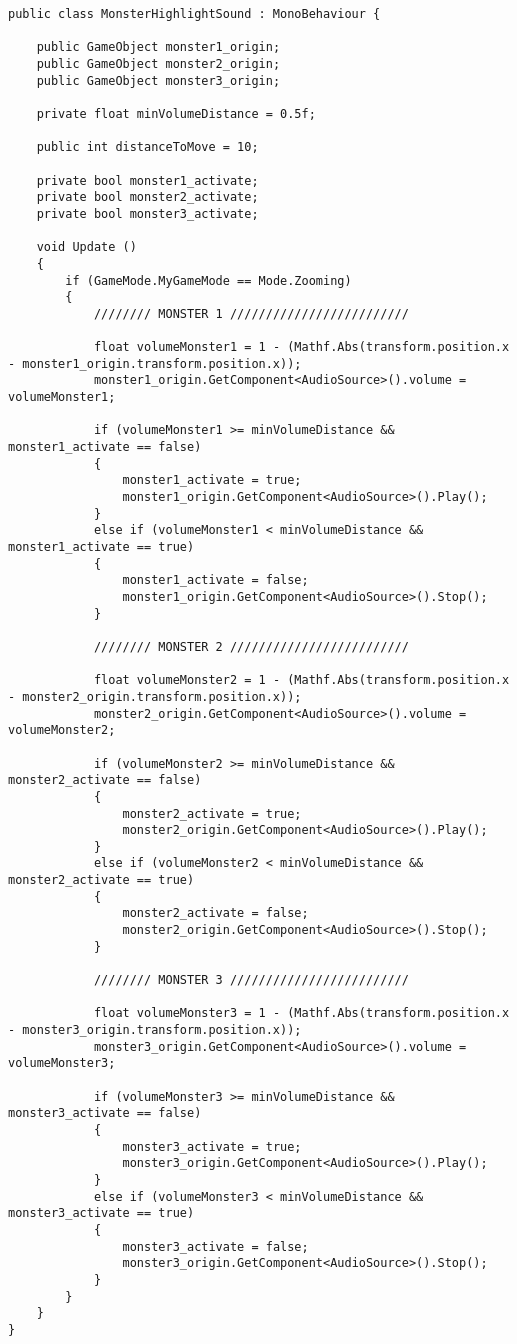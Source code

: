 \begin{lstlisting}
public class MonsterHighlightSound : MonoBehaviour {

    public GameObject monster1_origin;
    public GameObject monster2_origin;
    public GameObject monster3_origin;

    private float minVolumeDistance = 0.5f;

    public int distanceToMove = 10;

    private bool monster1_activate;
    private bool monster2_activate;
    private bool monster3_activate;

	void Update ()
    {
        if (GameMode.MyGameMode == Mode.Zooming)
        {
            //////// MONSTER 1 /////////////////////////

            float volumeMonster1 = 1 - (Mathf.Abs(transform.position.x - monster1_origin.transform.position.x));
            monster1_origin.GetComponent<AudioSource>().volume = volumeMonster1;

            if (volumeMonster1 >= minVolumeDistance && monster1_activate == false)
            {
                monster1_activate = true;
                monster1_origin.GetComponent<AudioSource>().Play();
            }
            else if (volumeMonster1 < minVolumeDistance && monster1_activate == true)
            {
                monster1_activate = false;
                monster1_origin.GetComponent<AudioSource>().Stop();
            }

            //////// MONSTER 2 /////////////////////////

            float volumeMonster2 = 1 - (Mathf.Abs(transform.position.x - monster2_origin.transform.position.x));
            monster2_origin.GetComponent<AudioSource>().volume = volumeMonster2;

            if (volumeMonster2 >= minVolumeDistance && monster2_activate == false)
            {
                monster2_activate = true;
                monster2_origin.GetComponent<AudioSource>().Play();
            }
            else if (volumeMonster2 < minVolumeDistance && monster2_activate == true)
            {
                monster2_activate = false;
                monster2_origin.GetComponent<AudioSource>().Stop();
            }

            //////// MONSTER 3 /////////////////////////

            float volumeMonster3 = 1 - (Mathf.Abs(transform.position.x - monster3_origin.transform.position.x));
            monster3_origin.GetComponent<AudioSource>().volume = volumeMonster3;

            if (volumeMonster3 >= minVolumeDistance && monster3_activate == false)
            {
                monster3_activate = true;
                monster3_origin.GetComponent<AudioSource>().Play();
            }
            else if (volumeMonster3 < minVolumeDistance && monster3_activate == true)
            {
                monster3_activate = false;
                monster3_origin.GetComponent<AudioSource>().Stop();
            }
        }
    }
}

\end{lstlisting}